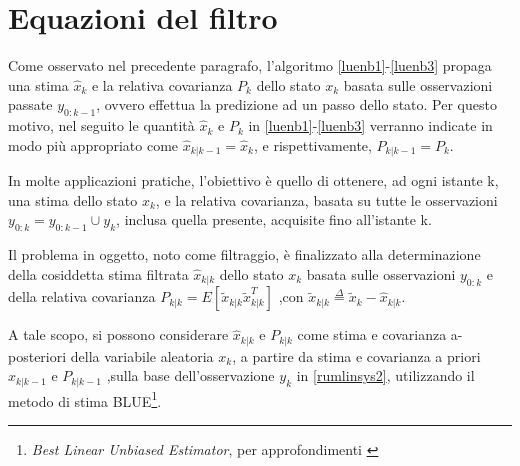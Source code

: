 \section{Equazioni del filtro}

Come osservato nel precedente paragrafo, l’algoritmo \eqref{luenb1}-\eqref{luenb3} propaga una stima $\hat{x}_k$ e la relativa covarianza $P_k$ dello stato $x_k$ basata sulle osservazioni passate $y_{0:k-1}$, ovvero effettua la predizione ad un passo dello stato. Per questo motivo, nel seguito le quantità $\hat{x}_k$ e $P_k$ in \eqref{luenb1}-\eqref{luenb3} verranno indicate in modo più appropriato come $\hat{x}_{k|k-1}=\hat{x}_k$, e rispettivamente, $P_{k|k-1}=P_k$.

In molte applicazioni pratiche, l’obiettivo è quello di ottenere, ad ogni istante k, una stima dello stato $x_k$, e la relativa covarianza, basata su tutte le osservazioni $y_{0:k}  = y_{0:k-1}\cup{y_k}$, inclusa quella presente, acquisite fino all’istante k.

Il problema in oggetto, noto come filtraggio, è finalizzato alla determinazione della cosiddetta stima filtrata $\hat{ x}_{ k|k}$ dello stato $x_k$ basata sulle osservazioni $y_{0:k}$ e della relativa covarianza $P_{k|k} = E[\tilde{x}_{k|k}\tilde{x}_{k|k}^T]$ ,con $\tilde{x}_{k|k}\stackrel{\Delta}{=}\tilde{x}_k-\hat{x}_{k|k}$. 

A tale scopo, si possono considerare $\hat{x}_{k|k}$ e  $P_{k|k}$ come stima e covarianza a-posteriori della variabile aleatoria $x_k$, a partire da stima e covarianza a priori $\hat{x}_{k|k-1}$ e $P_{k|k-1}$ ,sulla base dell'osservazione $y_k$ in \eqref{rumlinsys2}, utilizzando il metodo di stima BLUE\footnote{\emph{Best Linear Unbiased Estimator}, per approfondimenti \cite{stimablue}}.

